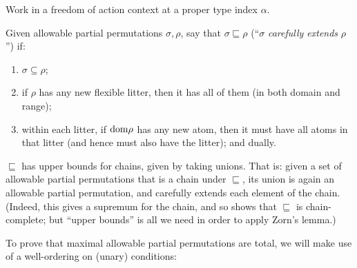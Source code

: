 \begin{definition}
  \label{def:allowable-partial-perm-order}
  \leanok
  Work in a freedom of action context at a proper type index $\alpha$.

  Given allowable partial permutations $\sigma, \rho$, say that $\sigma \sqsubseteq \rho$ (“$\sigma$ \emph{carefully extends} $\rho$”) if:

  \begin{enumerate}
  \item $\sigma \subseteq \rho$;
  \item if $\rho$ has any new flexible litter, then it has all of them (in both domain and range);
  \item within each litter, if $\mathrm{dom} \rho$ has any new atom, then it must have all atoms in that litter (and hence must also have the litter); and dually.
  \end{enumerate}
\end{definition}

\begin{proposition}
  \label{prop:allowable-partial-perm-chain-union}
  \leanok
  $\sqsubseteq$ has upper bounds for chains, given by taking unions.  That is: given a set of allowable partial permutations that is a chain under $\sqsubseteq$, its union is again an allowable partial permutation, and carefully extends each element of the chain.  (Indeed, this gives a supremum for the chain, and so shows that $\sqsubseteq$ is chain-complete; but “upper bounds” is all we need in order to apply Zorn’s lemma.)
\end{proposition}

To prove that maximal allowable partial permutations are total, we will make use of a well-ordering on (unary) conditions:

